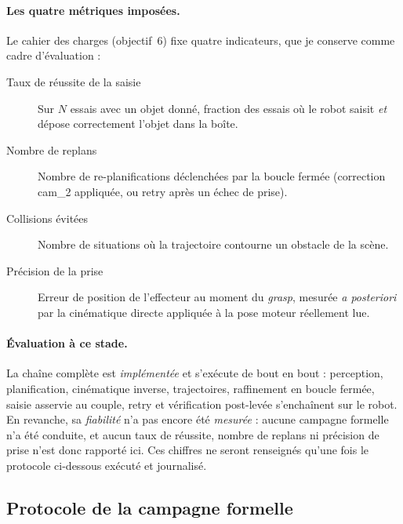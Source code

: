 \paragraph{Les quatre métriques imposées.} Le cahier des charges (objectif~6)
fixe quatre indicateurs, que je conserve comme cadre d'évaluation :

\begin{description}
  \item[Taux de réussite de la saisie] Sur $N$ essais avec un objet donné,
        fraction des essais où le robot saisit \emph{et} dépose correctement
        l'objet dans la boîte.
  \item[Nombre de replans] Nombre de re-planifications déclenchées par la boucle
        fermée (correction cam\_2 appliquée, ou retry après un échec de prise).
  \item[Collisions évitées] Nombre de situations où la trajectoire contourne un
        obstacle de la scène.
  \item[Précision de la prise] Erreur de position de l'effecteur au moment du
        \textit{grasp}, mesurée \textit{a posteriori} par la cinématique directe
        appliquée à la pose moteur réellement lue.
\end{description}

\paragraph{Évaluation à ce stade.} La chaîne complète est \emph{implémentée} et
s'exécute de bout en bout : perception, planification, cinématique inverse,
trajectoires, raffinement en boucle fermée, saisie asservie au couple, retry et
vérification post-levée s'enchaînent sur le robot. En revanche, sa
\emph{fiabilité} n'a pas encore été \emph{mesurée} : aucune campagne formelle n'a
été conduite, et aucun taux de réussite, nombre de replans ni précision de prise
n'est donc rapporté ici. Ces chiffres ne seront renseignés qu'une fois le
protocole ci-dessous exécuté et journalisé.

\subsection{Protocole de la campagne formelle}


